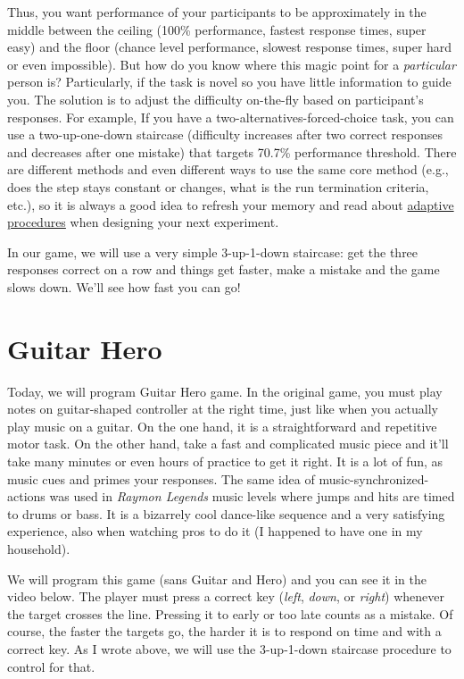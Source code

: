 \documentclass[
]{book}
\begin{document}
Thus, you want performance of your participants to be approximately in the middle between the ceiling (100\% performance, fastest response times, super easy) and the floor (chance level performance, slowest response times, super hard or even impossible). But how do you know where this magic point for a \emph{particular} person is? Particularly, if the task is novel so you have little information to guide you. The solution is to adjust the difficulty on-the-fly based on participant's responses. For example, If you have a two-alternatives-forced-choice task, you can use a two-up-one-down staircase (difficulty increases after two correct responses and decreases after one mistake) that targets 70.7\% performance threshold. There are different methods and even different ways to use the same core method (e.g., does the step stays constant or changes, what is the run termination criteria, etc.), so it is always a good idea to refresh your memory and read about \href{https://doi.org/10.3758/BF03194543}{adaptive procedures} when designing your next experiment.

In our game, we will use a very simple 3-up-1-down staircase: get the three responses correct on a row and things get faster, make a mistake and the game slows down. We'll see how fast you can go!

\hypertarget{guitar-hero}{%
\section{Guitar Hero}\label{guitar-hero}}

Today, we will program Guitar Hero game. In the original game, you must play notes on guitar-shaped controller at the right time, just like when you actually play music on a guitar. On the one hand, it is a straightforward and repetitive motor task. On the other hand, take a fast and complicated music piece and it'll take many minutes or even hours of practice to get it right. It is a lot of fun, as music cues and primes your responses. The same idea of music-synchronized-actions was used in \emph{Raymon Legends} music levels where jumps and hits are timed to drums or bass. It is a bizarrely cool dance-like sequence and a very satisfying experience, also when watching pros to do it (I happened to have one in my household).

We will program this game (sans Guitar and Hero) and you can see it in the video below. The player must press a correct key (\emph{left}, \emph{down}, or \emph{right}) whenever the target crosses the line. Pressing it to early or too late counts as a mistake. Of course, the faster the targets go, the harder it is to respond on time and with a correct key. As I wrote above, we will use the 3-up-1-down staircase procedure to control for that.
\end{document}
